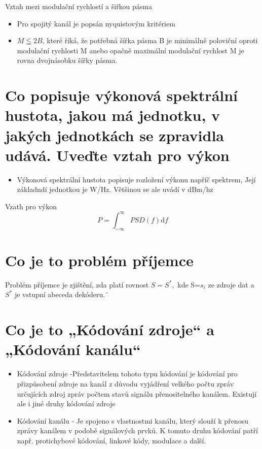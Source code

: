 Vztah mezi modulační rychlostí a šiřkou pásma
\begin{itemize}
    \item Pro spojitý kanál je popsán nyquistovým kritériem
    \item $M \leqq 2B $, které říká, že potřebná šířka pásma B je minimálně poloviční oproti modulační rychlosti M anebo opačně maximální modulační rychlost M je rovna dvojnásobku šířky pásma.
\end{itemize}

\section{Co popisuje výkonová spektrální hustota, jakou má jednotku, v jakých jednotkách se zpravidla udává. Uveďte vztah pro výkon}
\begin{itemize}
    \item Výkonová spektrální hustota popisuje rozložení výkonu napříč spektrem, Její základndí jednotkou je W/Hz. Většinou se ale uvádí v dBm/hz
\end{itemize}
Vzath pro výkon
$$P = \int_{-\infty}^{\infty} PSD(f)\mathrm{d}f$$

\section{Co je to problém příjemce}
Problém příjemce je zjištění, zda platí rovnost $S=S^*, $ kde S=${s_i}$ ze zdroje dat a $S^*$ je vstupní abeceda dekóderu.¨

\section{Co je to „Kódování zdroje“ a „Kódování kanálu“ }
\begin{itemize}
    \item Kódování zdroje -Představitelem tohoto typu kódování je kódování pro přizpůsobení zdroje na kanál z důvodu vyjádření velkého počtu zpráv určujících zdroj zpráv počtem stavů signálu přenositelného kanálem. Existují ale i jiné druhy kódování zdroje
    \item Kódování kanálu - Je spojeno s vlastnostmi kanálu, který slouží k přenosu zprávy kanálem v podobě signálových prvků. K tomuto druhu kódování patří např. protichybové kódování, linkové kódy, modulace a další.
\end{itemize}

